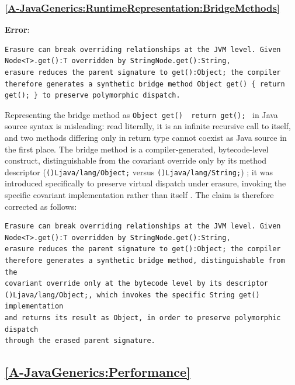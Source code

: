 \documentclass[11pt]{report}
\begin{document}
\subsubsection*{\hyperref[A-JavaGenerics:RuntimeRepresentation:BridgeMethods]{\ref*{A-JavaGenerics:RuntimeRepresentation:BridgeMethods} }}
\noindent\textbf{Error}:

\begin{Verbatim}[breaklines=true]
Erasure can break overriding relationships at the JVM level. Given
Node<T>.get():T overridden by StringNode.get():String,
erasure reduces the parent signature to get():Object; the compiler
therefore generates a synthetic bridge method Object get() { return
get(); } to preserve polymorphic dispatch.
\end{Verbatim}

Representing the bridge method as \texttt{Object get() { return get(); }}
in Java source syntax is misleading: read literally, it is an infinite
recursive call to itself, and two methods differing only in return type
cannot coexist as Java source in the first place. The bridge method is a
compiler-generated, bytecode-level construct, distinguishable from the
covariant override only by its method descriptor
(\texttt{()Ljava/lang/Object;} versus \texttt{()Ljava/lang/String;})
\cite{jvms2024}; it was introduced specifically to preserve virtual dispatch
under erasure, invoking the specific covariant implementation rather than
itself \cite{bracha2004}. The claim is therefore corrected as
follows:

\begin{Verbatim}[breaklines=true]
Erasure can break overriding relationships at the JVM level. Given
Node<T>.get():T overridden by StringNode.get():String,
erasure reduces the parent signature to get():Object; the compiler
therefore generates a synthetic bridge method, distinguishable from the
covariant override only at the bytecode level by its descriptor
()Ljava/lang/Object;, which invokes the specific String get() implementation
and returns its result as Object, in order to preserve polymorphic dispatch
through the erased parent signature.
\end{Verbatim}

\subsection*{\hyperref[A-JavaGenerics:Performance]{\ref*{A-JavaGenerics:Performance} }}
\end{document}
